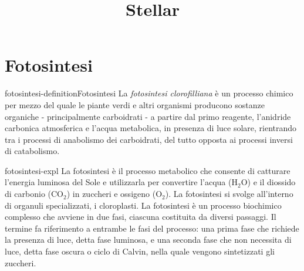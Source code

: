 \documentclass[preview]{standalone}
\begin{document}
\title{Stellar}
\genpage

\section{Fotosintesi}

\begin{snippetdefinition}{fotosintesi-definition}{Fotosintesi}
    La \textit{fotosintesi clorofilliana} è un processo chimico per mezzo del quale
    le piante verdi e altri organismi producono sostanze organiche -
    principalmente carboidrati - a partire dal primo reagente,
    l'anidride carbonica atmosferica e l'acqua metabolica,
    in presenza di luce solare, rientrando tra i processi di anabolismo dei carboidrati,
    del tutto opposta ai processi inversi di catabolismo.
\end{snippetdefinition}

\begin{snippet}{fotosintesi-expl}
    La fotosintesi è il processo metabolico che consente di catturare l'energia luminosa del Sole
    e utilizzarla per convertire l'acqua (H\({}_2\)O) e il diossido di carbonio (CO\({}_2\)) in zuccheri e
    ossigeno (O\({}_2\)). La fotosintesi si svolge all'interno di organuli specializzati, i cloroplasti. La
    fotosintesi è un processo biochimico complesso che avviene in due fasi, ciascuna costituita
    da diversi passaggi. Il termine  fa riferimento a entrambe le fasi del processo:
    una prima fase che richiede la presenza di luce, detta fase luminosa, e una seconda fase
    che non necessita di luce, detta fase oscura o ciclo di Calvin, nella quale vengono sintetizzati
    gli zuccheri.
\end{snippet}
\end{document}
